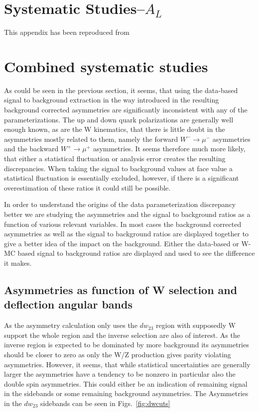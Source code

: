 \appendix

\section{Systematic Studies--$A_L$}
\label{appendix_1}

This appendix has been reproduced from~\cite{Seidl2014a}

\section{Combined systematic studies}
As could be seen in the previous section, it seems, that using the data-based
signal to background extraction in the way introduced in \cite{oide} the
resulting background corrected asymmetries are significantly inconsistent with
any of the parameterizations. The up and down quark polarizations are generally
well enough known, as are the W kinematics, that there is little doubt in the
asymmetries mostly related to them, namely the forward $W^-\rightarrow \mu^-$
asymmetries and the backward $W^+\rightarrow\mu^+$ asymmetries. It seems
therefore much more likely, that either a statistical fluctuation or analysis
error creates the resulting discrepancies. When taking the signal to background
values at face value a statistical fluctuation is essentially excluded, however,
if there is a significant overestimation of these ratios it could still be
possible. 

In order to understand the origins of the data parameterization discrepancy
better we are studying the asymmetries and the signal to background ratios as a
function of various relevant variables. In most cases the background corrected
asymmetries as well as the signal to background ratios are displayed together to
give a better idea of the impact on the background. Either the data-based or
W-MC based signal to background ratios are displayed and used to see the
difference it makes.

\subsection{Asymmetries as function of W selection and deflection angular bands}

As the asymmetry calculation only uses the $dw_{23}$ region with supposedly W support
the whole region and the inverse selection are also of interest. As the inverse
region is expected to be dominated by more background its asymmetries should be
closer to zero as only the W/Z production gives parity violating asymmetries.
However, it seems, that while statistical uncertainties are generally larger the
asymmetries have a tendency to be nonzero in particular also the double spin
asymmetries. This could either be an indication of remaining signal in the
sidebands or some remaining background asymmetries. The Asymmetries in the
$dw_{23}$ sidebands can be seen in Figs.~\ref{fig:dwcuts}

